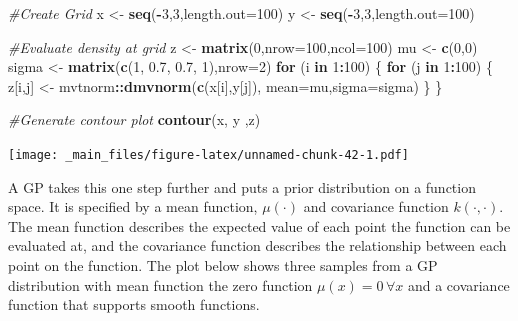 \documentclass[
]{book}
\newenvironment{Shaded}{\begin{snugshade}}{\end{snugshade}}
\newcommand{\AttributeTok}[1]{\textcolor[rgb]{0.13,0.29,0.53}{#1}}
\newcommand{\CommentTok}[1]{\textcolor[rgb]{0.56,0.35,0.01}{\textit{#1}}}
\newcommand{\ControlFlowTok}[1]{\textcolor[rgb]{0.13,0.29,0.53}{\textbf{#1}}}
\newcommand{\DecValTok}[1]{\textcolor[rgb]{0.00,0.00,0.81}{#1}}
\newcommand{\FloatTok}[1]{\textcolor[rgb]{0.00,0.00,0.81}{#1}}
\newcommand{\FunctionTok}[1]{\textcolor[rgb]{0.13,0.29,0.53}{\textbf{#1}}}
\newcommand{\NormalTok}[1]{#1}
\newcommand{\OtherTok}[1]{\textcolor[rgb]{0.56,0.35,0.01}{#1}}
\newcommand{\SpecialCharTok}[1]{\textcolor[rgb]{0.81,0.36,0.00}{\textbf{#1}}}
\theoremstyle{definition}
\theoremstyle{definition}
\theoremstyle{definition}
\theoremstyle{definition}
\theoremstyle{remark}
\begin{document}
\begin{Shaded}
\begin{Highlighting}[]
\CommentTok{\#Create Grid}
\NormalTok{x }\OtherTok{\textless{}{-}} \FunctionTok{seq}\NormalTok{(}\SpecialCharTok{{-}}\DecValTok{3}\NormalTok{,}\DecValTok{3}\NormalTok{,}\AttributeTok{length.out=}\DecValTok{100}\NormalTok{)}
\NormalTok{y }\OtherTok{\textless{}{-}} \FunctionTok{seq}\NormalTok{(}\SpecialCharTok{{-}}\DecValTok{3}\NormalTok{,}\DecValTok{3}\NormalTok{,}\AttributeTok{length.out=}\DecValTok{100}\NormalTok{)}

\CommentTok{\#Evaluate density at grid}
\NormalTok{z }\OtherTok{\textless{}{-}} \FunctionTok{matrix}\NormalTok{(}\DecValTok{0}\NormalTok{,}\AttributeTok{nrow=}\DecValTok{100}\NormalTok{,}\AttributeTok{ncol=}\DecValTok{100}\NormalTok{)}
\NormalTok{mu }\OtherTok{\textless{}{-}} \FunctionTok{c}\NormalTok{(}\DecValTok{0}\NormalTok{,}\DecValTok{0}\NormalTok{)}
\NormalTok{sigma }\OtherTok{\textless{}{-}} \FunctionTok{matrix}\NormalTok{(}\FunctionTok{c}\NormalTok{(}\DecValTok{1}\NormalTok{, }\FloatTok{0.7}\NormalTok{, }\FloatTok{0.7}\NormalTok{, }\DecValTok{1}\NormalTok{),}\AttributeTok{nrow=}\DecValTok{2}\NormalTok{)}
\ControlFlowTok{for}\NormalTok{ (i }\ControlFlowTok{in} \DecValTok{1}\SpecialCharTok{:}\DecValTok{100}\NormalTok{) \{}
  \ControlFlowTok{for}\NormalTok{ (j }\ControlFlowTok{in} \DecValTok{1}\SpecialCharTok{:}\DecValTok{100}\NormalTok{) \{}
\NormalTok{    z[i,j] }\OtherTok{\textless{}{-}}\NormalTok{ mvtnorm}\SpecialCharTok{::}\FunctionTok{dmvnorm}\NormalTok{(}\FunctionTok{c}\NormalTok{(x[i],y[j]),}
                      \AttributeTok{mean=}\NormalTok{mu,}\AttributeTok{sigma=}\NormalTok{sigma)}
\NormalTok{  \}}
\NormalTok{\}}

\CommentTok{\#Generate contour plot}
\FunctionTok{contour}\NormalTok{(x, y ,z)}
\end{Highlighting}
\end{Shaded}

\texttt{[image: \_main\_files/figure-latex/unnamed-chunk-42-1.pdf]}

A GP takes this one step further and puts a prior distribution on a function space. It is specified by a mean function, \(\mu(\cdot)\) and covariance function \(k(\cdot, \cdot)\). The mean function describes the expected value of each point the function can be evaluated at, and the covariance function describes the relationship between each point on the function. The plot below shows three samples from a GP distribution with mean function the zero function \(\mu(x) = 0\, \forall x\) and a covariance function that supports smooth functions.
\end{document}

